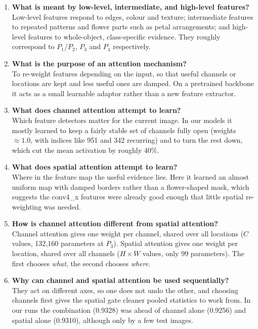\documentclass[10pt]{article}
\begin{document}
\begin{enumerate}
\item \textbf{What is meant by low-level, intermediate, and high-level features?}\\
Low-level features respond to edges, colour and texture; intermediate
features to repeated patterns and flower parts such as petal arrangements; and
high-level features to whole-object, class-specific evidence. They roughly
correspond to $P_1$/$P_2$, $P_3$ and $P_4$ respectively.

\item \textbf{What is the purpose of an attention mechanism?}\\
To re-weight features depending on the input, so that useful channels or
locations are kept and less useful ones are damped. On a pretrained backbone it
acts as a small learnable adaptor rather than a new feature extractor.

\item \textbf{What does channel attention attempt to learn?}\\
Which feature detectors matter for the current image. In our models it
mostly learned to keep a fairly stable set of channels fully open (weights
$\approx1.0$, with indices like 951 and 342 recurring) and to turn the rest down,
which cut the mean activation by roughly 40\%.

\item \textbf{What does spatial attention attempt to learn?}\\
Where in the feature map the useful evidence lies. Here it learned an
almost uniform map with damped borders rather than a flower-shaped mask, which
suggests the conv4\_x features were already good enough that little spatial
re-weighting was needed.

\item \textbf{How is channel attention different from spatial attention?}\\
Channel attention gives one weight per channel, shared over all
locations ($C$ values, 132{,}160 parameters at $P_3$). Spatial attention gives
one weight per location, shared over all channels ($H\times W$ values, only 99
parameters). The first chooses \emph{what}, the second chooses \emph{where}.

\item \textbf{Why can channel and spatial attention be used sequentially?}\\
They act on different axes, so one does not undo the other, and choosing
channels first gives the spatial gate cleaner pooled statistics to work from. In
our runs the combination (0.9328) was ahead of channel alone (0.9256) and
spatial alone (0.9310), although only by a few test images.


\end{enumerate}
\end{document}
